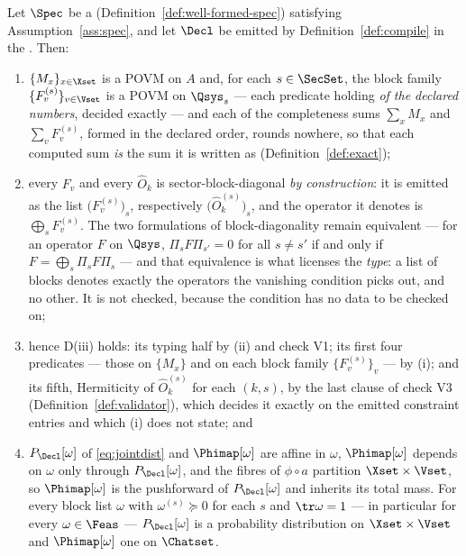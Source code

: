 \begin{theorem}\label{thm:measurements-and-statistics}
Let $\Spec$ be a 
(Definition~\ref{def:well-formed-spec}) satisfying
Assumption~\ref{ass:spec}, and
let $\Decl$ be emitted by Definition~\ref{def:compile} in the
. Then:
\begin{enumerate}[label=(\roman*),leftmargin=2.2em]
\item $\{M_x\}_{x\in\Xset}$ is a POVM on $A$ and, for each $s\in\SecSet$, the
block family $\{F_v^{(s)}\}_{v\in\Vset}$ is a POVM on $\Qsys_s$ --- each
predicate holding \emph{of the declared numbers}, decided exactly --- and each
of the completeness sums $\sum_xM_x$ and $\sum_vF_v^{(s)}$, formed in the
declared order, rounds nowhere, so that each computed sum \emph{is} the sum it
is written as (Definition~\ref{def:exact});
\item every $F_v$ and every $\hat O_k$ is sector-block-diagonal
\emph{by construction}: it is emitted as the list
$\big(F_v^{(s)}\big)_{s}$, respectively $\big(\hat O_k^{(s)}\big)_{s}$, and
the operator it denotes is $\bigoplus_sF_v^{(s)}$. The two formulations of
block-diagonality remain equivalent --- for an operator $F$ on $\Qsys$,
$\Pi_sF\Pi_{s'}=0$ for all $s\ne s'$ if and only if
$F=\bigoplus_s\Pi_sF\Pi_s$ --- and that equivalence is what licenses the
\emph{type}: a list of blocks denotes exactly the operators the vanishing
condition picks out, and no other. It is not checked, because the condition
has no data to be checked on;
\item hence D(iii) holds: its typing half by (ii) and check V1; its first
four predicates --- those on $\{M_x\}$ and on each block family
$\{F_v^{(s)}\}_v$ --- by (i); and its fifth, Hermiticity of
$\hat O_k^{(s)}$ for each $(k,s)$, by the last clause of check V3
(Definition~\ref{def:validator}), which decides it exactly on the emitted
constraint entries and which (i) does not state; and
\item $P_{\Decl}[\omega]$ of \eqref{eq:jointdist} and $\Phimap[\omega]$ are
affine in $\omega$, $\Phimap[\omega]$ depends on $\omega$ only through
$P_{\Decl}[\omega]$, and the fibres of $\phi\circ a$ partition
$\Xset\times\Vset$, so $\Phimap[\omega]$ is the pushforward of
$P_{\Decl}[\omega]$ and inherits its total mass. For every block list $\omega$
with $\omega^{(s)}\succeq0$ for each $s$ and $\tr\omega=1$ --- in particular
for every $\omega\in\Feas$ --- $P_{\Decl}[\omega]$ is a probability
distribution on $\Xset\times\Vset$ and $\Phimap[\omega]$ one on $\Chatset$.
\end{enumerate}


\end{theorem}

